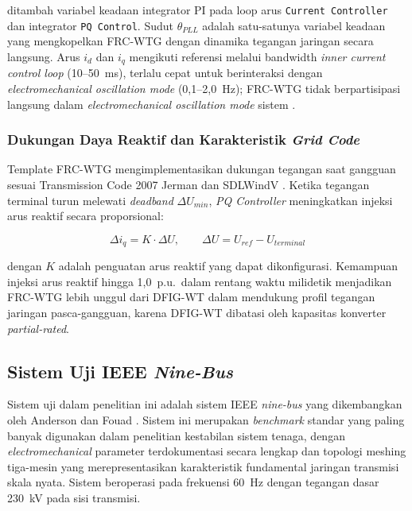 ditambah variabel keadaan integrator PI pada loop arus \texttt{Current Controller} dan
integrator \texttt{PQ Control}. Sudut $\theta_{PLL}$ adalah satu-satunya variabel
keadaan yang mengkopelkan FRC-WTG dengan dinamika tegangan jaringan secara langsung.
Arus $i_d$ dan $i_q$ mengikuti referensi melalui bandwidth \textit{inner current control
loop} (10--50~ms), terlalu cepat untuk berinteraksi dengan
\textit{electromechanical oscillation mode} (0{,}1--2{,}0~Hz); FRC-WTG tidak
berpartisipasi langsung dalam \textit{electromechanical oscillation mode}
sistem \cite{knuppel2009small}.

\subsubsection{Dukungan Daya Reaktif dan Karakteristik \textit{Grid Code}}

Template FRC-WTG mengimplementasikan dukungan tegangan saat gangguan sesuai
Transmission Code 2007 Jerman dan SDLWindV \cite{digsilent2024frc}. Ketika tegangan
terminal turun melewati \textit{deadband} $\Delta U_{min}$, \textit{PQ Controller}
meningkatkan injeksi arus reaktif secara proporsional:

\begin{equation}
  \Delta i_q = K \cdot \Delta U, \qquad \Delta U = U_{ref} - U_{terminal}
  \label{eq:frc-qsupport}
\end{equation}

dengan $K$ adalah penguatan arus reaktif yang dapat dikonfigurasi. Kemampuan injeksi
arus reaktif hingga 1{,}0~p.u.\ dalam rentang waktu milidetik menjadikan FRC-WTG
lebih unggul dari DFIG-WT dalam mendukung profil tegangan jaringan pasca-gangguan,
karena DFIG-WT dibatasi oleh kapasitas konverter \textit{partial-rated}.


\subsection{Sistem Uji IEEE \textit{Nine-Bus}}

Sistem uji dalam penelitian ini adalah sistem IEEE \textit{nine-bus} yang dikembangkan
oleh Anderson dan Fouad \cite{anderson1977power}. Sistem ini merupakan \textit{benchmark}
standar yang paling banyak digunakan dalam penelitian kestabilan sistem tenaga, dengan
\textit{electromechanical} parameter terdokumentasi secara lengkap dan topologi meshing tiga-mesin
yang merepresentasikan karakteristik fundamental jaringan transmisi skala nyata.
Sistem beroperasi pada frekuensi 60~Hz dengan tegangan dasar 230~kV pada sisi transmisi.

